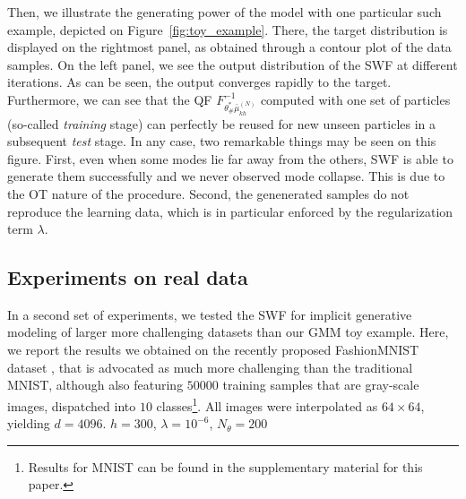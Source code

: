 Then, we illustrate the generating power of the model with one particular such example, depicted on Figure~\ref{fig:toy_example}. There, the target distribution is displayed on the rightmost panel, as obtained through a contour plot of the data samples. On the left panel, we see the output distribution of the SWF at different iterations. As can be seen, the output converges rapidly to the target. Furthermore, we can see that the QF $F^{-1}_{\theta^*_\#\bar{\mu}_{kh}^{(N)}}$ computed with one set of particles (so-called \textit{training} stage) can perfectly be reused for new unseen particles in a subsequent \textit{test} stage. In any case, two remarkable things may be seen on this figure. First, even when some modes lie far away from the others, SWF is able to generate them successfully and we never observed mode collapse. This is due to the OT nature of the procedure. Second, the genenerated samples do not reproduce the learning data, which is in particular enforced by the regularization term $\lambda$.

\subsection{Experiments on real data}
\label{sub:real_data}

In a second set of experiments, we tested the SWF for implicit generative modeling of larger more challenging datasets than our GMM toy example. Here, we report the results we obtained on the recently proposed FashionMNIST dataset \cite{xiao2017fashion}, that is advocated as much more challenging than the traditional MNIST, although also featuring $50000$ training samples that are gray-scale images, dispatched into $10$ classes\footnote{Results for MNIST can be found in the supplementary material for this paper.}. All images were interpolated as $64\times 64$, yielding $d=4096$. $h=300$, $\lambda=10^{-6}$, $N_\theta=200$

